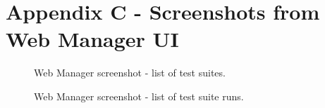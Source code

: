 \documentclass[11pt,oneside,final]{fithesis2}
\begin{document}
\chapter{Appendix C - Screenshots from Web Manager UI}
\label{appendix:c}
\begin{figure}[!htb]
    \begin{center}
    \leavevmode
    \centerline{}
    \end{center}
    \caption{Web Manager screenshot - list of test suites.}
    \label{fig:webManagerScreenTestSuiteList}
\end{figure}

\begin{figure}[!htb]
    \begin{center}
    \leavevmode
    \centerline{}
    \end{center}
    \caption{Web Manager screenshot - list of test suite runs.}
    \label{fig:webManagerScreenTestSuiteRunList}
\end{figure}
\end{document}
